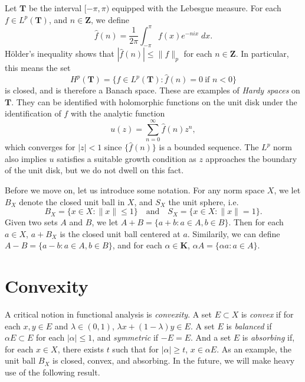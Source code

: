\begin{example}
    Let $\mathbf{T}$ be the interval $[-\pi,\pi)$ equipped with the Lebesgue measure. For each $f \in L^p(\mathbf{T})$, and $n \in \mathbf{Z}$, we define
    \[ \widehat{f}(n) = \frac{1}{2\pi} \int_{-\pi}^\pi f(x) e^{-nix}\; dx. \]
    H\"{o}lder's inequality shows that $|\widehat{f}(n)| \leq \| f \|_p$ for each $n \in \mathbf{Z}$. In particular, this means the set
    \[ H^p(\mathbf{T}) = \{ f \in L^p(\mathbf{T}) : \widehat{f}(n) = 0\ \text{if $n < 0$} \} \]
    is closed, and is therefore a Banach space. These are examples of {\it Hardy spaces} on $\mathbf{T}$. They can be identified with holomorphic functions on the unit disk under the identification of $f$ with the analytic function
    \[ u(z) = \sum_{n = 0}^\infty \widehat{f}(n) z^n, \]
    which converges for $|z| < 1$ since $\{ \widehat{f}(n) \}$ is a bounded sequence. The $L^p$ norm also implies $u$ satisfies a suitable growth condition as $z$ approaches the boundary of the unit disk, but we do not dwell on this fact.
\end{example}

Before we move on, let us introduce some notation. For any norm space $X$, we let $B_X$ denote the closed unit ball in $X$, and $S_X$ the unit sphere, i.e.
%
\[ B_X = \{ x \in X: \| x \| \leq 1 \}\quad\text{and}\quad S_X = \{ x \in X: \| x \| = 1 \}. \]
%
Given two sets $A$ and $B$, we let $A + B = \{ a + b : a \in A, b \in B \}$. Then for each $a \in X$, $a + B_X$ is the closed unit ball centered at $a$. Similarily, we can define $A - B = \{ a - b : a \in A, b \in B \}$, and for each $\alpha \in \mathbf{K}$, $\alpha A = \{ \alpha a : a \in A \}$.

\section{Convexity}

A critical notion in functional analysis is {\it convexity}. A set $E \subset X$ is {\it convex} if for each $x,y \in E$ and $\lambda \in (0,1)$, $\lambda x + (1 - \lambda) y \in E$. A set $E$ is {\it balanced} if $\alpha E \subset E$ for each $|\alpha| \leq 1$, and {\it symmetric} if $-E = E$. And a set $E$ is {\it absorbing} if, for each $x \in X$, there exists $t$ such that for $|\alpha| \geq t$, $x \in \alpha E$. As an example, the unit ball $B_X$ is closed, convex, and absorbing. In the future, we will make heavy use of the following result.


